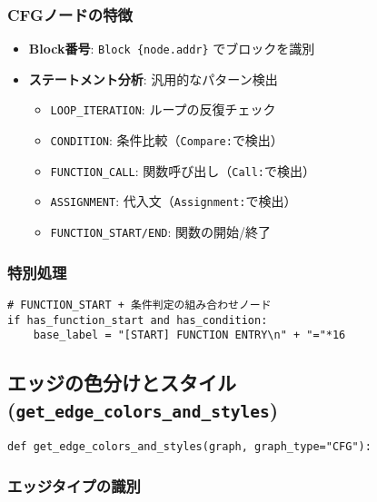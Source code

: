 \documentclass[a4paper,12pt]{article}
\begin{document}
\subsubsection{CFGノードの特徴}

\begin{itemize}
    \item \textbf{Block番号}: \texttt{Block \{node.addr\}} でブロックを識別
    \item \textbf{ステートメント分析}: 汎用的なパターン検出
    \begin{itemize}
        \item \texttt{LOOP\_ITERATION}: ループの反復チェック
        \item \texttt{CONDITION}: 条件比較（\texttt{Compare:}で検出）
        \item \texttt{FUNCTION\_CALL}: 関数呼び出し（\texttt{Call:}で検出）
        \item \texttt{ASSIGNMENT}: 代入文（\texttt{Assignment:}で検出）
        \item \texttt{FUNCTION\_START/END}: 関数の開始/終了
    \end{itemize}
\end{itemize}

\subsubsection{特別処理}

\begin{lstlisting}[caption=特別処理の例]
# FUNCTION_START + 条件判定の組み合わせノード
if has_function_start and has_condition:
    base_label = "[START] FUNCTION ENTRY\n" + "="*16
\end{lstlisting}

\subsection{エッジの色分けとスタイル (\texttt{get\_edge\_colors\_and\_styles})}

\begin{lstlisting}[caption=エッジ色分け関数]
def get_edge_colors_and_styles(graph, graph_type="CFG"):
\end{lstlisting}

\subsubsection{エッジタイプの識別}
\end{document}
